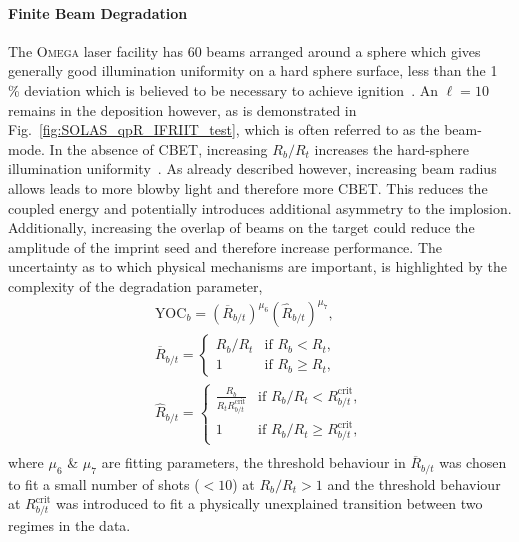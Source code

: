 \paragraph*{Finite Beam Degradation}
The \textsc{Omega} laser facility has 60 beams arranged around a sphere which gives generally good illumination uniformity on a hard sphere surface, less than the 1 \% deviation which is believed to be necessary to achieve ignition~\cite{craxton_direct-drive_2015,goncharov_national_2017}.
An $\ell=10$ remains in the deposition however, as is demonstrated in Fig.~\ref{fig:SOLAS_qpR_IFRIIT_test}, which is often referred to as the beam-mode.
In the absence of \ac{CBET}, increasing $R_b/R_t$ increases the hard-sphere illumination uniformity~\cite{gopalaswamy_using_2021}.
As already described however, increasing beam radius allows leads to more blowby light and therefore more \ac{CBET}.
This reduces the coupled energy and potentially introduces additional asymmetry to the implosion.
Additionally, increasing the overlap of beams on the target could reduce the amplitude of the imprint seed and therefore increase performance.
The uncertainty as to which physical mechanisms are important, is highlighted by the complexity of the degradation parameter,
\begin{equation}
    \label{eq:Res1_RbRt_degradation}
    \begin{gathered}
        \text{YOC}_{b} = \left( \overline{R}_{b/t} \right)^{\mu_6} \left( \hat{R}_{b/t} \right)^{\mu_7}, \\
        \overline{R}_{b/t} =
        \begin{cases}
            R_b/R_t & \text{if } R_b<R_t, \\
            1 &  \text{if } R_b\geq R_t,
        \end{cases} \\
        \hat{R}_{b/t} =
        \begin{cases}
            \frac{R_b}{R_t R_{b/t}^{\text{crit}}} & \text{if } R_b/R_t < R_{b/t}^{\text{crit}}, \\
            1 & \text{if } R_b/R_t \geq R_{b/t}^{\text{crit}},
        \end{cases} \\
    \end{gathered}
\end{equation}
where $\mu_6$ \& $\mu_7$ are fitting parameters, the threshold behaviour in $\overline{R}_{b/t}$ was chosen to fit a small number of shots ($<10$) at $R_b/R_t>1$ and the threshold behaviour at $R_{b/t}^{\text{crit}}$ was introduced to fit a physically unexplained transition between two regimes in the data.

